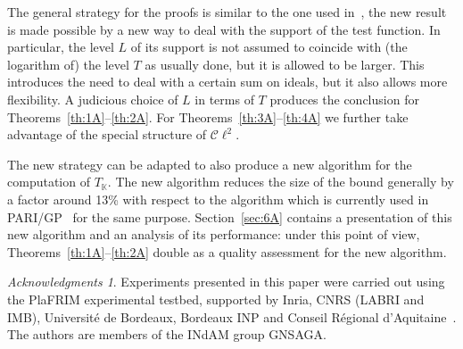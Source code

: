 \documentclass[a4paper,11pt]{amsart}
\newcommand{\field}[1]{\mathbb{{#1}}}
\newcommand{\K}{\field{{K}}}
\newcommand{\Cl}{\mathcal C\!\ell}
\theoremstyle{remark}
\newtheorem*{acknowledgments}{Acknowledgments}
\begin{document}
The general strategy for the proofs is similar to the one used in~\cite{GrenieMolteni7}, the new result
is made possible by a new way to deal with the support of the test function. In particular, the level $L$
of its support is not assumed to coincide with (the logarithm of) the level $T$ as usually done, but it
is allowed to be larger. This introduces the need to deal with a certain sum on ideals, but it also
allows more flexibility. A judicious choice of $L$ in terms of $T$ produces the conclusion for
Theorems~\ref{th:1A}--\ref{th:2A}. For Theorems~\ref{th:3A}--\ref{th:4A} we further take advantage of the
special structure of $\Cl^2$.
\smallskip

The new strategy can be adapted to also produce a new algorithm for the computation of $T_\K$. The new
algorithm reduces the size of the bound generally by a factor around 13\% with respect to the algorithm
which is currently used in PARI/GP~\cite{PARI2} for the same purpose. Section~\ref{sec:6A} contains a
presentation of this new algorithm and an analysis of its performance: under this point of view,
Theorems~\ref{th:1A}--\ref{th:2A} double as a quality assessment for the new algorithm.

\medskip

\begin{acknowledgments}
Experiments presented in this paper were carried out using the PlaFRIM experimental testbed, supported by
Inria, CNRS (LABRI and IMB), Universit\'{e} de Bordeaux, Bordeaux INP and Conseil R\'{e}gional
d’Aquitaine~\cite{BORDEAUX-CLUSTER}. %
The authors are members of the INdAM group GNSAGA.
\end{acknowledgments}
\end{document}
